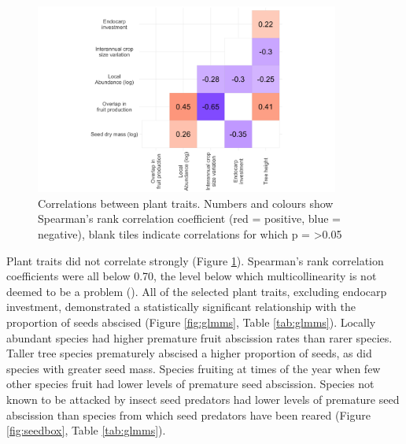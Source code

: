 \begin{figure}[!h]
\centering
\includegraphics[width=10cm]{traitsCorr.png}
\caption{Correlations between plant traits. Numbers and colours show Spearman’s rank correlation coefficient (red = positive, blue = negative), blank tiles indicate correlations for which p = \textgreater0.05}
\label{fig:corrmat}
\end{figure}

Plant traits did not correlate strongly (Figure \ref{fig:corrmat}). Spearman's rank correlation coefficients were all below 0.70, the level below which multicollinearity is not deemed to be a problem (\cite{tabachnickUsingMultivariateStatistics1989}).
All of the selected plant traits, excluding endocarp investment, demonstrated a statistically significant relationship with the proportion of seeds abscised (Figure \ref{fig:glmms}, Table \ref{tab:glmms}). Locally abundant species had higher premature fruit abscission rates than rarer species. Taller tree species prematurely abscised a higher proportion of seeds, as did species with greater seed mass. Species fruiting at times of the year when few other species fruit had lower levels of premature seed abscission. Species not known to be attacked by insect seed predators had lower levels of premature seed abscission than species from which seed predators have been reared (Figure \ref{fig:seedbox}, Table \ref{tab:glmms}).

